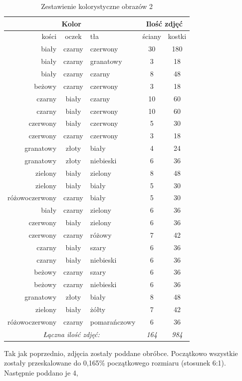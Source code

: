 \begin{table}[h!]
\centering
\begin{tabular}{rcl|cc}
\multicolumn{3}{c}{Kolor} & \multicolumn{2}{c}{Ilość zdjęć} \\ \hline
kości & oczek & tła & ściany & kostki \\ \hline
biały & czarny & czerwony & 30 & 180 \\
biały & czarny & granatowy & 3 & 18 \\
biały & czarny & czarny & 8 & 48 \\
beżowy & czarny & czerwony & 3 & 18 \\
czarny & biały & czarny & 10 & 60 \\
czarny & biały & czerwony & 10 & 60 \\
czerwony & biały & czerwony & 5 & 30 \\
czerwony & czarny & czerwony & 3 & 18 \\
granatowy & złoty & biały & 4 & 24 \\
granatowy & złoty & niebieski & 6 & 36 \\
zielony & biały & zielony & 8 & 48 \\
zielony & biały & biały & 5 & 30 \\
różowoczerwony & czarny & biały & 5 & 30 \\ \hline
biały & czarny & zielony & 6 & 36 \\
czerwony & biały & zielony & 6 & 36 \\
czerwony & czarny & różowy & 7 & 42 \\
czarny & biały & szary & 6 & 36 \\
czarny & biały & niebieski & 6 & 36 \\
beżowy & czarny & szary & 6 & 36 \\
beżowy & czarny & niebieski & 6 & 36 \\
granatowy & złoty & biały & 8 & 48 \\
zielony & biały & żółty & 7 & 42 \\
różowoczerwony & czarny & pomarańczowy & 6 & 36 \\ \hline
\multicolumn{3}{c}{\textit{Łączna ilość zdjęć:}} & \textit{164} & \textit{984}
\end{tabular}
\vspace{0.2cm}
\caption{Zestawienie kolorystyczne obrazów 2}
\label{tab:zestawienie2}
\end{table}
Tak jak poprzednio, zdjęcia zostały poddane obróbce. Początkowo wszystkie zostały
przeskalowane do 0,165\% początkowego rozmiaru (stosunek 6:1). Następnie poddano je 4,
